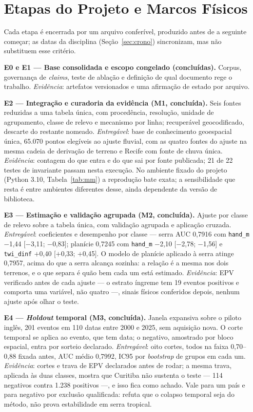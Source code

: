 \documentclass[conference]{IEEEtran}
\begin{document}
\section{Etapas do Projeto e Marcos Físicos}
\label{sec:etapas}

Cada etapa é encerrada por um arquivo conferível, produzido antes de a seguinte
começar; as datas da disciplina (Seção~\ref{sec:crono}) sincronizam, mas não
substituem esse critério.

\textbf{E0 e E1 --- Base consolidada e escopo congelado (concluídas).} Corpus,
governança de \emph{claims}, teste de ablação e definição de qual documento rege
o trabalho. \emph{Evidência}: artefatos versionados e uma afirmação de estado por
arquivo.

\textbf{E2 --- Integração e curadoria da evidência (M1, concluída).} Seis fontes
reduzidas a uma tabela única, com procedência, resolução, unidade de
agrupamento, classe de relevo e mecanismo por linha; recuperável geocodificado,
descarte do restante nomeado. \emph{Entregável}: base de conhecimento
geoespacial única, 65.070 pontos elegíveis ao ajuste fluvial, com as quatro
fontes do ajuste na mesma cadeia de derivação de terreno e Recife com fonte de
chuva única. \emph{Evidência}: contagem do que entra e do que sai por fonte
publicada; 21 de 22 testes de invariante passam nesta execução. No ambiente
fixado do projeto (Python 3.10, Tabela~\ref{tab:mm}) a reprodução bate exata;
a sensibilidade que resta é entre ambientes diferentes desse, ainda dependente
da versão de biblioteca.

\textbf{E3 --- Estimação e validação agrupada (M2, concluída).} Ajuste por classe
de relevo sobre a tabela única, com validação agrupada e aplicação cruzada.
\emph{Entregável}: coeficientes e desempenho por classe --- serra AUC 0,7916 com
\texttt{hand\_m} $-$1,44 [$-$3,11; $-$0,83]; planície 0,7245 com \texttt{hand\_m}
$-$2,10 [$-$2,78; $-$1,56] e \texttt{twi\_dinf} $+$0,40 [$+$0,33; $+$0,45]. O
modelo de planície aplicado à serra atinge 0,7957, acima do que a serra alcança
sozinha: a relação é a mesma nos dois terrenos, e o que separa é quão bem cada um
está estimado. \emph{Evidência}: EPV verificado antes de cada ajuste --- o
estrato íngreme tem 19 eventos positivos e comporta uma variável, não quatro ---,
sinais físicos conferidos depois, nenhum ajuste após olhar o teste.

\textbf{E4 --- \emph{Holdout} temporal (M3, concluída).} Janela expansiva sobre o
piloto inglês, 201 eventos em 110 datas entre 2000 e 2025, sem aquisição nova. O
corte temporal se aplica ao evento, que tem data; o negativo, amostrado por bloco
espacial, entra por sorteio declarado. \emph{Entregável}: oito cortes, todos na
faixa 0,70--0,88 fixada antes, AUC médio 0,7992, IC95 por \emph{bootstrap} de
grupos em cada um. \emph{Evidência}: cortes e trava de EPV declarados antes de
rodar; a mesma trava, aplicada às duas classes, mostra que Curitiba não sustenta
o teste --- 114 negativos contra 1.238 positivos ---, e isso fica como achado.
Vale para um país e para negativo por exclusão qualificada: refuta que o colapso
temporal seja do método, não prova estabilidade em serra tropical.
\end{document}
